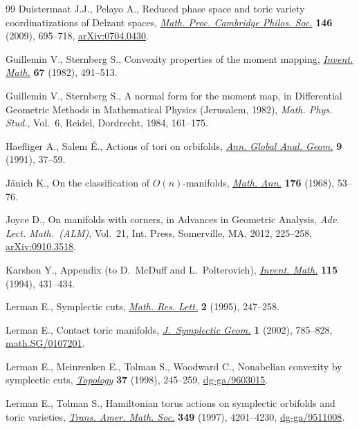 \documentclass[10pt,a4paper]{amsart}
\numberwithin{equation}{section}
\begin{document}
\begin{thebibliography}{99}
Duistermaat J.J., Pelayo A., Reduced phase space and toric variety
  coordinatizations of {D}elzant spaces, \href{http://dx.doi.org/10.1017/S0305004108002077}{\textit{Math. Proc. Cambridge Philos.
  Soc.}} \textbf{146} (2009), 695--718, \href{http://arxiv.org/abs/0704.0430}{arXiv:0704.0430}.

Guillemin V., Sternberg S., Convexity properties of the moment mapping,
  \href{http://dx.doi.org/10.1007/BF01398933}{\textit{Invent. Math.}} \textbf{67} (1982), 491--513.

Guillemin V., Sternberg S., A normal form for the moment map, in Dif\/ferential
  Geometric Methods in Mathematical Physics ({J}erusalem, 1982), \textit{Math.
  Phys. Stud.}, Vol.~6, Reidel, Dordrecht, 1984, 161--175.

Haef\/liger A., Salem {\'E}., Actions of tori on orbifolds, \href{http://dx.doi.org/10.1007/BF02411354}{\textit{Ann. Global
  Anal. Geom.}} \textbf{9} (1991), 37--59.

J{\"a}nich K., On the classif\/ication of {$O(n)$}-manifolds, \href{http://dx.doi.org/10.1007/BF02052956}{\textit{Math. Ann.}}
  \textbf{176} (1968), 53--76.

Joyce D., On manifolds with corners, in Advances in Geometric Analysis,
  \textit{Adv. Lect. Math.~(ALM)}, Vol.~21, Int. Press, Somerville, MA, 2012,
  225--258, \href{http://arxiv.org/abs/0910.3518}{arXiv:0910.3518}.

Karshon Y., Appendix (to {D}.~{M}c{D}uf\/f and {L}.~{P}olterovich),
  \href{http://dx.doi.org/10.1007/BF01231767}{\textit{Invent. Math.}} \textbf{115} (1994), 431--434.

Lerman E., Symplectic cuts, \href{http://dx.doi.org/10.4310/MRL.1995.v2.n3.a2}{\textit{Math. Res. Lett.}} \textbf{2} (1995),
  247--258.

Lerman E., Contact toric manifolds, \href{http://dx.doi.org/10.4310/JSG.2001.v1.n4.a6}{\textit{J.~Symplectic Geom.}} \textbf{1}
  (2002), 785--828, \href{http://arxiv.org/abs/math.SG/0107201}{math.SG/0107201}.

Lerman E., Meinrenken E., Tolman S., Woodward C., Nonabelian convexity by
  symplectic cuts, \href{http://dx.doi.org/10.1016/S0040-9383(97)00030-X}{\textit{Topology}} \textbf{37} (1998), 245--259,
  \href{http://arxiv.org/abs/dg-ga/9603015}{dg-ga/9603015}.

Lerman E., Tolman S., Hamiltonian torus actions on symplectic orbifolds and
  toric varieties, \href{http://dx.doi.org/10.1090/S0002-9947-97-01821-7}{\textit{Trans. Amer. Math. Soc.}} \textbf{349} (1997),
  4201--4230, \href{http://arxiv.org/abs/dg-ga/9511008}{dg-ga/9511008}.


\end{thebibliography}
\end{document}
